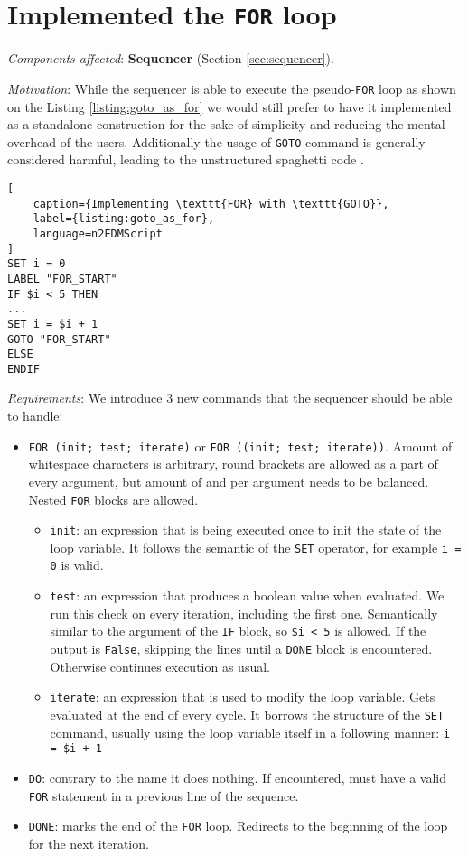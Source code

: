 \section{Implemented the \texttt{FOR} loop}
\label{sec:for_loop}

\textit{Components affected}: \textbf{Sequencer} (Section \ref{sec:sequencer}).

\textit{Motivation}: While the sequencer is able to execute the pseudo-\texttt{FOR} loop as shown on the Listing \ref{listing:goto_as_for} we would still prefer to have it implemented as a standalone construction for the sake of simplicity and reducing the mental overhead of the users. Additionally the usage of \texttt{GOTO} command is generally considered \cite{Dijkstra1968} harmful, leading to the unstructured spaghetti code \cite{Cram2005}.

\begin{lstlisting}[
	caption={Implementing \texttt{FOR} with \texttt{GOTO}}, 
	label={listing:goto_as_for}, 
	language=n2EDMScript
]
SET i = 0
LABEL "FOR_START"
IF $i < 5 THEN
...
SET i = $i + 1
GOTO "FOR_START"
ELSE
ENDIF
\end{lstlisting}

\textit{Requirements}: We introduce 3 new commands that the sequencer should be able to handle:

\begin{itemize}
	\item \texttt{FOR (init; test; iterate)} or \texttt{FOR ((init; test; iterate))}. Amount of whitespace characters is arbitrary, round brackets are allowed as a part of every argument, but amount of \highlight{(} and \highlight{)} per argument needs to be balanced. Nested \texttt{FOR} blocks are allowed.
	\begin{itemize}
		\item \texttt{init}: an expression that is being executed once to init the state of the loop variable. It follows the semantic of the \texttt{SET} operator, for example \texttt{i = 0} is valid.
		\item \texttt{test}: an expression that produces a boolean value when evaluated. We run this check on every iteration, including the first one. Semantically similar to the argument of the \texttt{IF} block, so \texttt{\$i < 5} is allowed. If the output is \texttt{False}, skipping the lines until a \texttt{DONE} block is encountered. Otherwise continues execution as usual.
		\item \texttt{iterate}: an expression that is used to modify the loop variable. Gets evaluated at the end of every cycle. It borrows the structure of the \texttt{SET} command, usually using the loop variable itself in a following manner: \texttt{i = \$i + 1}
	\end{itemize}
	\item \texttt{DO}: contrary to the name it does nothing. If encountered, must have a valid \texttt{FOR} statement in a previous line of the sequence.
	\item \texttt{DONE}: marks the end of the \texttt{FOR} loop. Redirects to the beginning of the loop for the next iteration.
\end{itemize}

